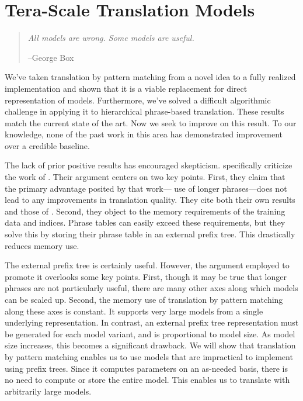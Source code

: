 \chapter{Tera-Scale Translation Models}\label{chap:scaling}

\begin{quote}
	{\em All models are wrong.  Some models are useful.}
	\begin{flushright}
		--George Box
	\end{flushright}
\end{quote}

We've taken translation by pattern matching from a novel
idea to a fully realized implementation and shown that it
is a viable replacement for direct representation of models.
Furthermore, we've solved a difficult algorithmic challenge
in applying it to hierarchical phrase-based translation.
These results match the current state of the art.
Now we seek to improve on this result.  To our
knowledge, none of the past work in this area 
\citep{Callison-Burch:2005:acl,Zhang:2005:eamt} has demonstrated
improvement over a credible baseline.

The lack of prior positive results has encouraged skepticism.
\citet{Zens:2007:hlt-naacl} specifically criticize
the work of \citet{Callison-Burch:2005:acl}.
Their argument centers on two key points.  First, they
claim that the primary advantage posited by that work---
use of longer phrases---does not lead to any improvements in 
translation quality.  They cite both their
own results and those of \citet{Koehn:2003:naacl}.
Second, they object to the memory requirements of
the training data and indices.  Phrase tables
can easily exceed these requirements, but they solve
this by storing their phrase table in an external
prefix tree.  This drastically reduces memory
use.

The external prefix tree is certainly useful.  
However, the argument employed
to promote it overlooks some key points.
First, though it may be true that longer phrases are not 
particularly useful, there are many other axes along which
models can be scaled up.  Second, the memory use
of translation by pattern matching along these axes is constant.
It supports very large models from a single underlying representation.  In 
contrast, an external prefix tree representation must
be generated for each model variant, and 
is proportional to model size.  As model
size increases, this becomes a significant drawback.
We will show that translation by pattern matching enables us
to use models that are impractical to implement using prefix trees.
Since it computes parameters on an as-needed basis, there
is no need to compute or store the entire model.  This
enables us to translate with arbitrarily large models.

